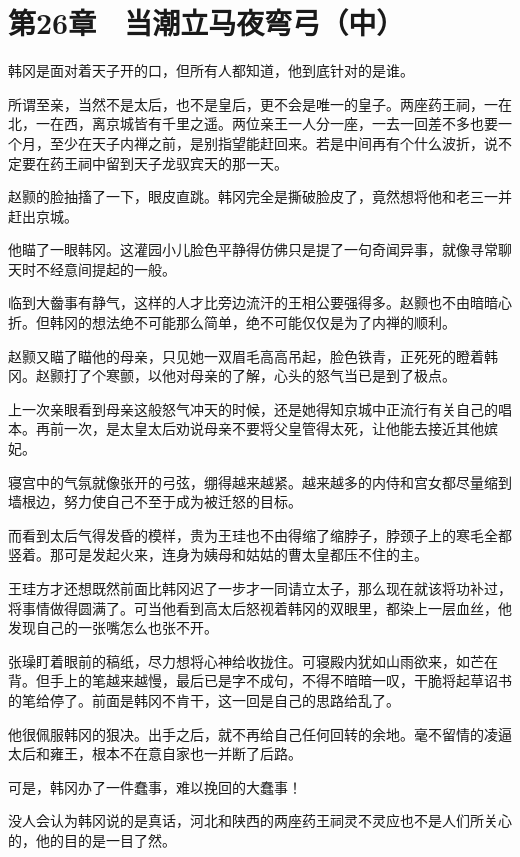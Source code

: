 \section{第26章　当潮立马夜弯弓（中）}

韩冈是面对着天子开的口，但所有人都知道，他到底针对的是谁。

所谓至亲，当然不是太后，也不是皇后，更不会是唯一的皇子。两座药王祠，一在北，一在西，离京城皆有千里之遥。两位亲王一人分一座，一去一回差不多也要一个月，至少在天子内禅之前，是别指望能赶回来。若是中间再有个什么波折，说不定要在药王祠中留到天子龙驭宾天的那一天。

赵颢的脸抽搐了一下，眼皮直跳。韩冈完全是撕破脸皮了，竟然想将他和老三一并赶出京城。

他瞄了一眼韩冈。这灌园小儿脸色平静得仿佛只是提了一句奇闻异事，就像寻常聊天时不经意间提起的一般。

临到大齤事有静气，这样的人才比旁边流汗的王相公要强得多。赵颢也不由暗暗心折。但韩冈的想法绝不可能那么简单，绝不可能仅仅是为了内禅的顺利。

赵颢又瞄了瞄他的母亲，只见她一双眉毛高高吊起，脸色铁青，正死死的瞪着韩冈。赵颢打了个寒颤，以他对母亲的了解，心头的怒气当已是到了极点。

上一次亲眼看到母亲这般怒气冲天的时候，还是她得知京城中正流行有关自己的唱本。再前一次，是太皇太后劝说母亲不要将父皇管得太死，让他能去接近其他嫔妃。

寝宫中的气氛就像张开的弓弦，绷得越来越紧。越来越多的内侍和宫女都尽量缩到墙根边，努力使自己不至于成为被迁怒的目标。

而看到太后气得发昏的模样，贵为王珪也不由得缩了缩脖子，脖颈子上的寒毛全都竖着。那可是发起火来，连身为姨母和姑姑的曹太皇都压不住的主。

王珪方才还想既然前面比韩冈迟了一步才一同请立太子，那么现在就该将功补过，将事情做得圆满了。可当他看到高太后怒视着韩冈的双眼里，都染上一层血丝，他发现自己的一张嘴怎么也张不开。

张璪盯着眼前的稿纸，尽力想将心神给收拢住。可寝殿内犹如山雨欲来，如芒在背。但手上的笔越来越慢，最后已是字不成句，不得不暗暗一叹，干脆将起草诏书的笔给停了。前面是韩冈不肯干，这一回是自己的思路给乱了。

他很佩服韩冈的狠决。出手之后，就不再给自己任何回转的余地。毫不留情的凌逼太后和雍王，根本不在意自家也一并断了后路。

可是，韩冈办了一件蠢事，难以挽回的大蠢事！

没人会认为韩冈说的是真话，河北和陕西的两座药王祠灵不灵应也不是人们所关心的，他的目的是一目了然。


